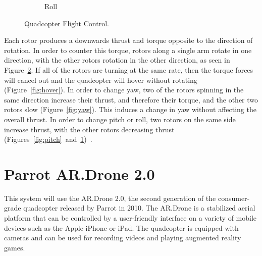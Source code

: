 \begin{figure}[ht]
\begin{subfigure}[b]{0.4\textwidth}
                        \caption{Roll}
                        \label{fig:roll}
                \end{subfigure}
                \caption{Quadcopter Flight Control.}\label{fig:flightbasics}
        \end{figure}

        Each rotor produces a downwards thrust and torque opposite to the direction of rotation. In order to counter this torque, rotors along a single arm rotate in one direction, with the other rotors rotation in the other direction, as seen in Figure~\ref{fig:flightbasics}. If all of the rotors are turning at the same rate, then the torque forces will cancel out and the quadcopter will hover without rotating (Figure~\ref{fig:hover}). In order to change yaw, two of the rotors spinning in the same direction increase their thrust, and therefore their torque, and the other two rotors slow (Figure~\ref{fig:yaw}). This induces a change in yaw without affecting the overall thrust. In order to change pitch or roll, two rotors on the same side increase thrust, with the other rotors decreasing thrust (Figures~\ref{fig:pitch}~and~\ref{fig:roll})~\cite{Dijkshoorn}.

\section{Parrot AR.Drone 2.0}

    This system will use the AR.Drone 2.0, the second generation of the consumer-grade quadcopter released by Parrot in 2010. The AR.Drone is a stabilized aerial platform that can be controlled by a user-friendly interface on a variety of mobile devices such as the Apple iPhone or iPad. The quadcopter is equipped with cameras and can be used for recording videos and playing augmented reality games.

